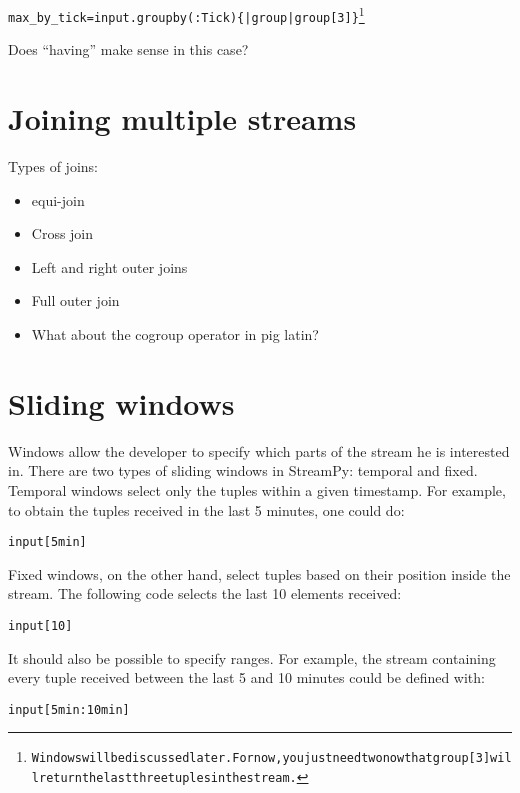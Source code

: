 \documentclass[twoside]{report}
\begin{document}
\begin{alltt}
  max_by_tick = input.groupby(:Tick) \{ |group| group[3] \}\footnote{Windows will be discussed later. For now, you just need two now that group[3] will return the last three tuples in the stream.}
\end{alltt}

Does ``having'' make sense in this case?

\section{Joining multiple streams}

Types of joins:
\begin{itemize}
\item equi-join
\item Cross join
\item Left and right outer joins
\item Full outer join
\item What about the cogroup operator in pig latin?

\end{itemize}
\section{Sliding windows}

Windows allow the developer to specify which parts of the stream he is interested in. There are two types of sliding windows in StreamPy: temporal and fixed. Temporal windows select only the tuples within a given timestamp. For example, to obtain the tuples received in the last 5 minutes, one could do:

\begin{verbatim}
input[5min]
\end{verbatim}

Fixed windows, on the other hand, select tuples based on their position inside the stream. The following code selects the last 10 elements received:

\begin{verbatim}
input[10]
\end{verbatim}

It should also be possible to specify ranges. For example, the stream containing every tuple received between the last 5 and 10 minutes could be defined with:

\begin{verbatim}
input[5min:10min]
\end{verbatim}
\end{document}
